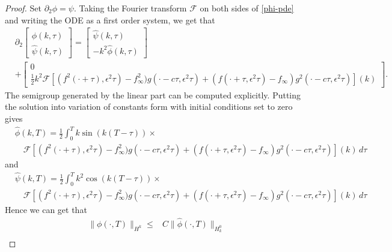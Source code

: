 \begin{proof}
	Set \(\partial_2 \phi = \psi\). Taking the Fourier transform \(\mathcal F\) on both sides of \cref{phi-pde} and writing the ODE as a first order system, we get that 
	\begin{equation}
	\begin{aligned}
		&\partial_2 \begin{bmatrix} \hat \phi(k,\tau) \\ \hat \psi(k,\tau) \end{bmatrix} = \begin{bmatrix}\hat \psi(k,\tau) \\ -k^2 \hat\phi(k,\tau) \end{bmatrix} \\ &+ \begin{bmatrix}
			0 \\   \frac 1 2 k^2 \mathcal F[ (f^2(\cdot+\tau),\epsilon^2\tau)-f_\infty^2)g(\cdot-c\tau,\epsilon^2\tau) +(f(\cdot+\tau,\epsilon^2\tau)-f_\infty)g^2(\cdot-c\tau,\epsilon^2\tau)](k)
		\end{bmatrix}.
	\end{aligned}
	\end{equation}
	The semigroup generated by the linear part can be computed explicitly. Putting the solution into variation of constants form with initial conditions set to zero gives
	\begin{equation}
	\begin{aligned}
		&\hat  \phi(k,T) = \frac 1 2 \int_0^Tk\sin(k(T-\tau)) \times\\
		&\quad\mathcal F[ (f^2(\cdot+\tau),\epsilon^2\tau)-f_\infty^2)g(\cdot-c\tau,\epsilon^2\tau) +(f(\cdot+\tau,\epsilon^2\tau)-f_\infty)g^2(\cdot-c\tau,\epsilon^2\tau)](k)\, d\tau
	\end{aligned}
	\end{equation}
	and 
	\begin{equation}
	\begin{aligned}
		&\hat  \psi(k,T) = \frac 1 2 \int_0^Tk^2\cos(k(T-\tau)) \times\\
		&\quad\mathcal F[ (f^2(\cdot+\tau),\epsilon^2\tau)-f_\infty^2)g(\cdot-c\tau,\epsilon^2\tau) +(f(\cdot+\tau,\epsilon^2\tau)-f_\infty)g^2(\cdot-c\tau,\epsilon^2\tau)](k)\, d\tau
	\end{aligned}
	\end{equation}
	Hence we can get that 
	\begin{align*}
		\|\phi(\cdot, T) \|_{H^k} \leq& C \| \hat\phi(\cdot, T) \|_{H^0_k} \\

\end{align*}
\end{proof}
